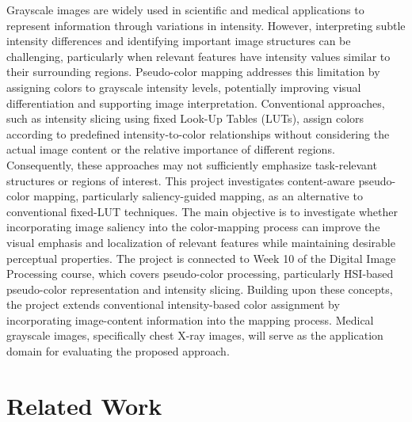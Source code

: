 \documentclass[11pt]{article}
\begin{document}
Grayscale images are widely used in scientific and medical applications to represent information through variations in intensity. However, interpreting subtle intensity differences and identifying important image structures can be challenging, particularly when relevant features have intensity values similar to their surrounding regions. Pseudo-color mapping addresses this limitation by assigning colors to grayscale intensity levels, potentially improving visual differentiation and supporting image interpretation. Conventional approaches, such as intensity slicing using fixed Look-Up Tables (LUTs), assign colors according to predefined intensity-to-color relationships without considering the actual image content or the relative importance of different regions. Consequently, these approaches may not sufficiently emphasize task-relevant structures or regions of interest. This project investigates content-aware pseudo-color mapping, particularly saliency-guided mapping, as an alternative to conventional fixed-LUT techniques. The main objective is to investigate whether incorporating image saliency into the color-mapping process can improve the visual emphasis and localization of relevant features while maintaining desirable perceptual properties. The project is connected to Week 10 of the Digital Image Processing course, which covers pseudo-color processing, particularly HSI-based pseudo-color representation and intensity slicing. Building upon these concepts, the project extends conventional intensity-based color assignment by incorporating image-content information into the mapping process. Medical grayscale images, specifically chest X-ray images, will serve as the application domain for evaluating the proposed approach.

\newpage
\section{Related Work}
\label{sec:related}
\end{document}
